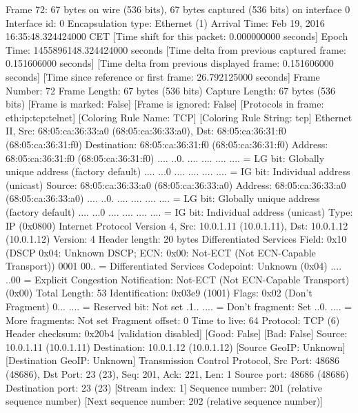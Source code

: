 Frame 72: 67 bytes on wire (536 bits), 67 bytes captured (536 bits) on interface 0
    Interface id: 0
    Encapsulation type: Ethernet (1)
    Arrival Time: Feb 19, 2016 16:35:48.324424000 CET
    [Time shift for this packet: 0.000000000 seconds]
    Epoch Time: 1455896148.324424000 seconds
    [Time delta from previous captured frame: 0.151606000 seconds]
    [Time delta from previous displayed frame: 0.151606000 seconds]
    [Time since reference or first frame: 26.792125000 seconds]
    Frame Number: 72
    Frame Length: 67 bytes (536 bits)
    Capture Length: 67 bytes (536 bits)
    [Frame is marked: False]
    [Frame is ignored: False]
    [Protocols in frame: eth:ip:tcp:telnet]
    [Coloring Rule Name: TCP]
    [Coloring Rule String: tcp]
Ethernet II, Src: 68:05:ca:36:33:a0 (68:05:ca:36:33:a0), Dst: 68:05:ca:36:31:f0 (68:05:ca:36:31:f0)
    Destination: 68:05:ca:36:31:f0 (68:05:ca:36:31:f0)
        Address: 68:05:ca:36:31:f0 (68:05:ca:36:31:f0)
        .... ..0. .... .... .... .... = LG bit: Globally unique address (factory default)
        .... ...0 .... .... .... .... = IG bit: Individual address (unicast)
    Source: 68:05:ca:36:33:a0 (68:05:ca:36:33:a0)
        Address: 68:05:ca:36:33:a0 (68:05:ca:36:33:a0)
        .... ..0. .... .... .... .... = LG bit: Globally unique address (factory default)
        .... ...0 .... .... .... .... = IG bit: Individual address (unicast)
    Type: IP (0x0800)
Internet Protocol Version 4, Src: 10.0.1.11 (10.0.1.11), Dst: 10.0.1.12 (10.0.1.12)
    Version: 4
    Header length: 20 bytes
    Differentiated Services Field: 0x10 (DSCP 0x04: Unknown DSCP; ECN: 0x00: Not-ECT (Not ECN-Capable Transport))
        0001 00.. = Differentiated Services Codepoint: Unknown (0x04)
        .... ..00 = Explicit Congestion Notification: Not-ECT (Not ECN-Capable Transport) (0x00)
    Total Length: 53
    Identification: 0x03e9 (1001)
    Flags: 0x02 (Don't Fragment)
        0... .... = Reserved bit: Not set
        .1.. .... = Don't fragment: Set
        ..0. .... = More fragments: Not set
    Fragment offset: 0
    Time to live: 64
    Protocol: TCP (6)
    Header checksum: 0x20b4 [validation disabled]
        [Good: False]
        [Bad: False]
    Source: 10.0.1.11 (10.0.1.11)
    Destination: 10.0.1.12 (10.0.1.12)
    [Source GeoIP: Unknown]
    [Destination GeoIP: Unknown]
Transmission Control Protocol, Src Port: 48686 (48686), Dst Port: 23 (23), Seq: 201, Ack: 221, Len: 1
    Source port: 48686 (48686)
    Destination port: 23 (23)
    [Stream index: 1]
    Sequence number: 201    (relative sequence number)
    [Next sequence number: 202    (relative sequence number)]
